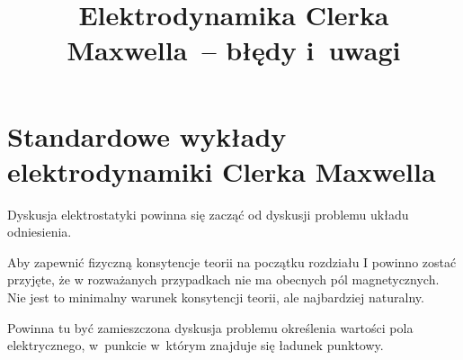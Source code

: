 \documentclass[a4paper,11pt]{article}
\title{Elektrodynamika Clerka Maxwella~-- błędy i~uwagi}
\begin{document}





\maketitle %





\section{Standardowe wykłady elektrodynamiki Clerka Maxwella}

\vspace{\spaceTwo}








Dyskusja elektrostatyki powinna się zacząć od dyskusji problemu układu
odniesienia.

\vspace{\spaceFour}



Aby zapewnić fizyczną konsytencje teorii na początku rozdziału I
powinno zostać przyjęte, że w rozważanych przypadkach nie ma obecnych
pól magnetycznych. Nie jest to minimalny warunek konsytencji teorii,
ale najbardziej naturalny.

\vspace{\spaceFour}








 Powinna tu być zamieszczona dyskusja problemu określenia wartości
pola elektrycznego, w~punkcie w~którym znajduje się ładunek punktowy.
\end{document}
